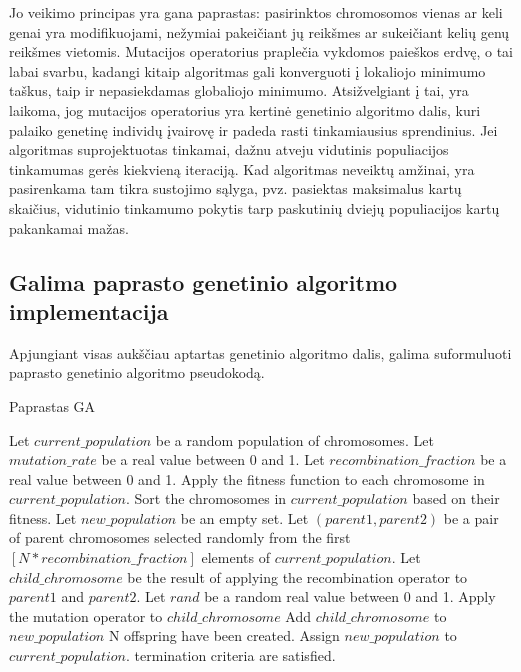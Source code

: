 \documentclass{VUMIFInfKursinis}
\begin{document}
Jo veikimo principas yra gana paprastas: pasirinktos chromosomos vienas ar keli genai yra modifikuojami,
nežymiai pakeičiant jų reikšmes ar sukeičiant kelių genų reikšmes vietomis.
Mutacijos operatorius praplečia vykdomos paieškos erdvę, o tai labai svarbu, kadangi kitaip algoritmas gali konverguoti
į lokaliojo minimumo taškus, taip ir nepasiekdamas globaliojo minimumo.
Atsižvelgiant į tai, yra laikoma, jog mutacijos operatorius yra kertinė genetinio algoritmo dalis,
kuri palaiko genetinę individų įvairovę ir padeda rasti tinkamiausius sprendinius.
Jei algoritmas suprojektuotas tinkamai, dažnu atveju vidutinis populiacijos tinkamumas gerės kiekvieną iteraciją.
Kad algoritmas neveiktų amžinai, yra pasirenkama tam tikra sustojimo sąlyga, pvz. pasiektas maksimalus
kartų skaičius, vidutinio tinkamumo pokytis tarp paskutinių dviejų populiacijos kartų pakankamai mažas.


\subsection{Galima paprasto genetinio algoritmo implementacija}

Apjungiant visas aukščiau aptartas genetinio algoritmo dalis, galima suformuluoti paprasto genetinio algoritmo pseudokodą.

\begin{algorithm}[H]
  \caption{Paprastas GA}\label{simple_GA}
  \begin{algorithmic}
    \State Let $current\_population$ be a random population of chromosomes.
    \State Let $mutation\_rate$ be a real value between 0 and 1.
    \State Let $recombination\_fraction$ be a real value between 0 and 1.
    \Repeat
      \State Apply the fitness function to each chromosome in $current\_population$.
      \State Sort the chromosomes in $current\_population$ based on their fitness.
      \State Let $new\_population$ be an empty set.
      \Repeat
        \State Let $(parent1, parent2)$ be a pair of parent chromosomes selected randomly from the first $[N * recombination\_fraction]$ elements of $current\_population$.
        \State Let $child\_chromosome$ be the result of applying the recombination operator to $parent1$ and $parent2$.
        \State Let $rand$ be a random real value between 0 and 1.
          \State Apply the mutation operator to $child\_chromosome$
        \EndIf
        \State Add $child\_chromosome$ to $new\_population$
      \Until N offspring have been created.
      \State Assign $new\_population$ to $current\_population$.
    \Until termination criteria are satisfied.
  \end{algorithmic}
\end{algorithm}
\end{document}
